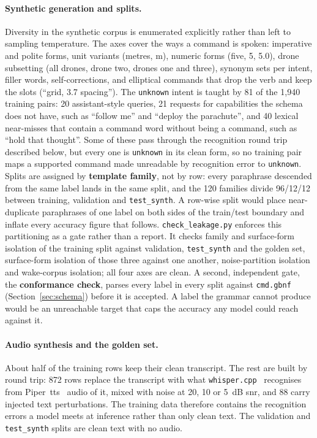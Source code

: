 \paragraph{Synthetic generation and splits.} Diversity in the synthetic corpus is enumerated
explicitly rather than left to sampling temperature. The axes cover the ways a command is spoken:
imperative and polite forms, unit variants (metres, m), numeric forms (five, 5, 5.0),
drone subsetting (all drones, drone two, drones one and three), synonym sets per intent, filler
words, self-corrections, and elliptical commands that drop the verb and keep the slots (``grid, 3.7
spacing''). The \texttt{unknown} intent is taught by 81 of the 1{,}940 training pairs: 20
assistant-style queries, 21 requests for capabilities the schema does not have, such as ``follow
me'' and ``deploy the parachute'', and 40 lexical near-misses that contain a command word without
being a command, such as ``hold that thought''. Some of these
pass through the recognition round trip described below, but every one is \texttt{unknown} in its
clean form, so no training pair maps a supported command made unreadable by recognition error to
\texttt{unknown}. Splits are assigned by \textbf{template family},
not by row: every paraphrase descended from the same label lands in the same split, and the 120
families divide 96/12/12 between training, validation and \texttt{test\_synth}. A row-wise split
would place near-duplicate paraphrases of one label on both sides of the train/test boundary and
inflate every accuracy figure that follows. \texttt{check\_leakage.py} enforces this
partitioning as a gate rather than a report. It checks family and surface-form isolation of the
training split against validation, \texttt{test\_synth} and the golden set, surface-form isolation
of those three against one another, noise-partition isolation and wake-corpus isolation; all four
axes are clean. A second, independent gate, the \textbf{conformance check}, parses every label in
every split against \texttt{cmd.gbnf} (Section~\ref{sec:schema}) before it is accepted. A label the
grammar cannot produce would be an unreachable target that caps the accuracy any model could reach
against it.

\paragraph{Audio synthesis and the golden set.} About half of the training rows keep their clean
transcript. The rest are built by round trip: 872 rows replace the transcript with what
\texttt{whisper.cpp}~\cite{whispercpp} recognises from Piper~\gls{tts}~\cite{piper} audio of it,
mixed with noise at 20, 10 or 5~dB \gls{snr}, and 88 carry injected text perturbations. The training
data therefore contains the recognition errors a model meets at inference rather than only clean
text. The validation and \texttt{test\_synth} splits are clean text with no audio.

